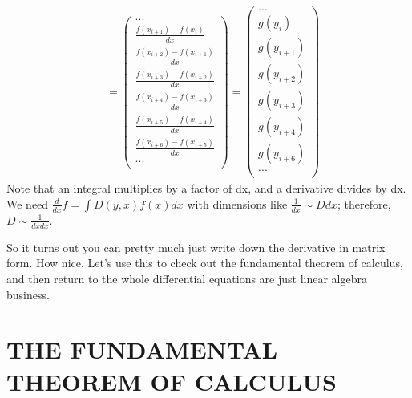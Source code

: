 \documentclass[12pt]{article}
\begin{document}
\begin{equation}
\begin{split}
&=
\begin{pmatrix}
... \\
\frac{f(x_{i+1}) - f(x_i) }{dx} \\
\frac{f(x_{i+2}) - f(x_{i+1})}{dx} \\
\frac{f(x_{i+3}) - f(x_{i+2})}{dx} \\
\frac{f(x_{i+4}) - f(x_{i+3})}{dx} \\
\frac{f(x_{i+5}) - f(x_{i+4})}{dx} \\
\frac{f(x_{i+6}) - f(x_{i+5})}{dx} \\
... \\
\end{pmatrix}
=
\begin{pmatrix}
... \\
g(y_i) \\
g(y_{i+1}) \\
g(y_{i+2}) \\
g(y_{i+3}) \\
g(y_{i+4}) \\
g(y_{i+6}) \\
... \\
\end{pmatrix}
\end{split}
\end{equation}
Note that an integral multiplies by a factor of dx, and a derivative divides by dx. We need $\frac{d}{dx}f = \int D(y,x)f(x)dx$ with dimensions like $\frac{1}{dx} \sim D dx$; therefore, $D \sim \frac{1}{dxdx}$.

So it turns out you can pretty much just write down the derivative in matrix form. How nice. Let's use this to check out the fundamental theorem of calculus, and then return to the whole differential equations are just linear algebra business. 

\section{THE FUNDAMENTAL THEOREM OF CALCULUS}
\end{document}
